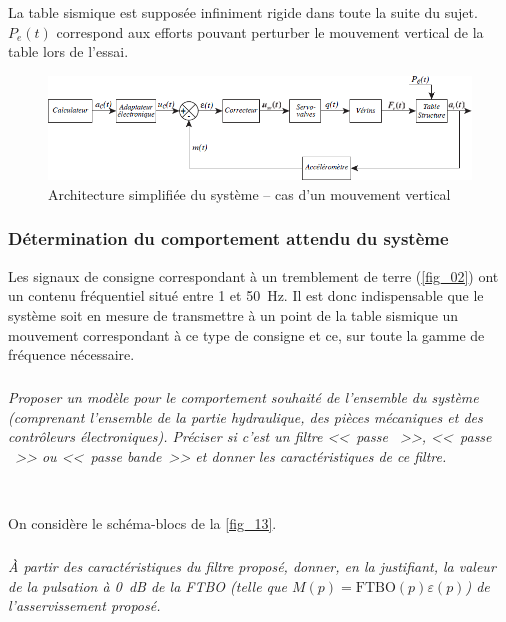 \documentclass[10pt,fleqn]{article} %
\begin{document}
La table sismique est supposée infiniment rigide dans toute la suite du sujet. $P_e(t)$ correspond aux efforts
pouvant perturber le mouvement vertical de la table lors de l’essai.


\begin{figure}[H]
\centering
\includegraphics[width=\linewidth]{fig_13}
\caption{Architecture simplifiée du système -- cas d’un mouvement vertical \label{fig_13}}
\end{figure}


\subsubsection{Détermination du comportement attendu du système}

Les signaux de consigne correspondant à un tremblement de terre (\autoref{fig_02}) ont un contenu fréquentiel
situé entre 1 et \SI{50}{Hz}. Il est donc indispensable que le système soit en mesure de transmettre à un point de
la table sismique un mouvement correspondant à ce type de consigne et ce, sur toute la gamme de fréquence
nécessaire.

\subparagraph{\label{q_}}\textit{Proposer un modèle pour le comportement souhaité de l’ensemble du système (comprenant l’ensemble de la partie hydraulique, des pièces mécaniques et des contrôleurs électroniques).
Préciser si c’est un filtre <<~passe ~>>,  <<~passe ~>> ou <<~passe bande~>> et donner les
caractéristiques de ce filtre.}
\ifprof
\begin{corrige} ~\\

\end{corrige}
\else
\fi


On considère le schéma-blocs de la \autoref{fig_13}.

\subparagraph{\label{q_}}\textit{À partir des caractéristiques du filtre proposé, donner, en la justifiant, la valeur de la pulsation à \SI{0}{dB} de la FTBO (telle que $M(p) = \text{FTBO}(p)\varepsilon(p)$) de l’asservissement proposé.}
\ifprof
\begin{corrige} ~\\

\end{corrige}
\else
\fi
\end{document}
